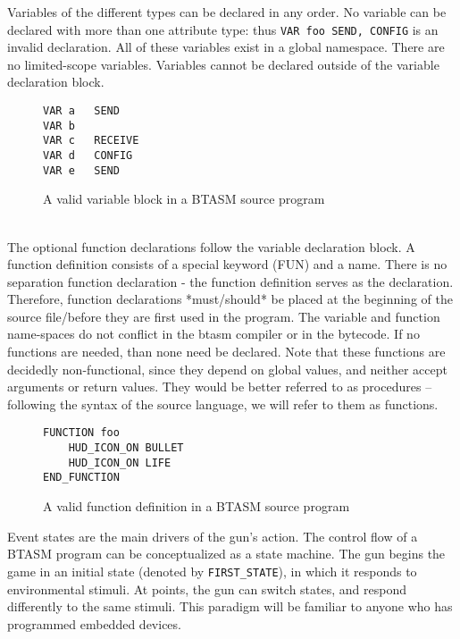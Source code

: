 \documentclass[12pt,a4paper]{scrbook}
\begin{document}
Variables of the different types can be declared in any order.  No variable can be declared
with more than one attribute type: thus \lstinline|VAR foo SEND, CONFIG| is an invalid
declaration.  All of these variables exist in a global namespace.  There are no limited-scope 
variables.  Variables cannot be declared outside of the variable declaration block.  

\begin{figure}[h]
\begin{lstlisting}
VAR a	SEND
VAR b
VAR c   RECEIVE
VAR d	CONFIG
VAR e	SEND
\end{lstlisting}
\caption{A valid variable block in a BTASM source program} 
\end{figure}

\ \\

The optional function declarations follow the variable declaration block.  A function definition
consists of a special keyword (FUN) and a name.  There is no separation function declaration - the
function definition serves as the declaration.  Therefore, function declarations *must/should* be
placed at the beginning of the source file/before they are first
used in the program.  The variable and function name-spaces do not
conflict in the btasm compiler or in the bytecode.  
If no functions are needed, than none need be declared.  Note 
that these functions are decidedly non-functional, since they depend on global values, and neither
accept arguments or return values.  They would be better referred to as procedures -- following the
syntax of the source language, we will refer to them as functions.


  

\begin{figure}[h]
\begin{lstlisting}
FUNCTION foo
	HUD_ICON_ON BULLET
	HUD_ICON_ON LIFE
END_FUNCTION
\end{lstlisting}
\caption{A valid function definition in a BTASM source program} 
\end{figure}


Event states are the main drivers of the gun's action.  The control flow of a BTASM program can be
conceptualized as a state machine.  The gun begins the game in an initial state (denoted by 
\texttt{FIRST\_STATE}), in which it responds to environmental stimuli.  At points, the gun can switch
states, and respond differently to the same stimuli.  This paradigm will be familiar to anyone who
has programmed embedded devices.
\end{document}
